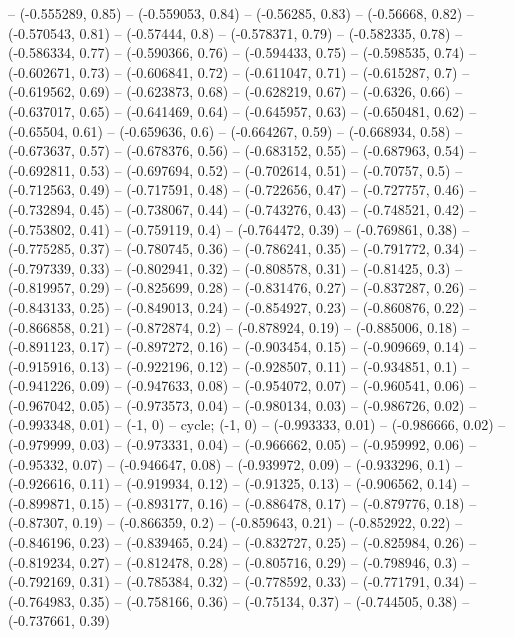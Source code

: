 -- (-0.555289, 0.85)
-- (-0.559053, 0.84)
-- (-0.56285, 0.83)
-- (-0.56668, 0.82)
-- (-0.570543, 0.81)
-- (-0.57444, 0.8)
-- (-0.578371, 0.79)
-- (-0.582335, 0.78)
-- (-0.586334, 0.77)
-- (-0.590366, 0.76)
-- (-0.594433, 0.75)
-- (-0.598535, 0.74)
-- (-0.602671, 0.73)
-- (-0.606841, 0.72)
-- (-0.611047, 0.71)
-- (-0.615287, 0.7)
-- (-0.619562, 0.69)
-- (-0.623873, 0.68)
-- (-0.628219, 0.67)
-- (-0.6326, 0.66)
-- (-0.637017, 0.65)
-- (-0.641469, 0.64)
-- (-0.645957, 0.63)
-- (-0.650481, 0.62)
-- (-0.65504, 0.61)
-- (-0.659636, 0.6)
-- (-0.664267, 0.59)
-- (-0.668934, 0.58)
-- (-0.673637, 0.57)
-- (-0.678376, 0.56)
-- (-0.683152, 0.55)
-- (-0.687963, 0.54)
-- (-0.692811, 0.53)
-- (-0.697694, 0.52)
-- (-0.702614, 0.51)
-- (-0.70757, 0.5)
-- (-0.712563, 0.49)
-- (-0.717591, 0.48)
-- (-0.722656, 0.47)
-- (-0.727757, 0.46)
-- (-0.732894, 0.45)
-- (-0.738067, 0.44)
-- (-0.743276, 0.43)
-- (-0.748521, 0.42)
-- (-0.753802, 0.41)
-- (-0.759119, 0.4)
-- (-0.764472, 0.39)
-- (-0.769861, 0.38)
-- (-0.775285, 0.37)
-- (-0.780745, 0.36)
-- (-0.786241, 0.35)
-- (-0.791772, 0.34)
-- (-0.797339, 0.33)
-- (-0.802941, 0.32)
-- (-0.808578, 0.31)
-- (-0.81425, 0.3)
-- (-0.819957, 0.29)
-- (-0.825699, 0.28)
-- (-0.831476, 0.27)
-- (-0.837287, 0.26)
-- (-0.843133, 0.25)
-- (-0.849013, 0.24)
-- (-0.854927, 0.23)
-- (-0.860876, 0.22)
-- (-0.866858, 0.21)
-- (-0.872874, 0.2)
-- (-0.878924, 0.19)
-- (-0.885006, 0.18)
-- (-0.891123, 0.17)
-- (-0.897272, 0.16)
-- (-0.903454, 0.15)
-- (-0.909669, 0.14)
-- (-0.915916, 0.13)
-- (-0.922196, 0.12)
-- (-0.928507, 0.11)
-- (-0.934851, 0.1)
-- (-0.941226, 0.09)
-- (-0.947633, 0.08)
-- (-0.954072, 0.07)
-- (-0.960541, 0.06)
-- (-0.967042, 0.05)
-- (-0.973573, 0.04)
-- (-0.980134, 0.03)
-- (-0.986726, 0.02)
-- (-0.993348, 0.01)
-- (-1, 0)
-- cycle;
\drawBand (-1, 0)
-- (-0.993333, 0.01)
-- (-0.986666, 0.02)
-- (-0.979999, 0.03)
-- (-0.973331, 0.04)
-- (-0.966662, 0.05)
-- (-0.959992, 0.06)
-- (-0.95332, 0.07)
-- (-0.946647, 0.08)
-- (-0.939972, 0.09)
-- (-0.933296, 0.1)
-- (-0.926616, 0.11)
-- (-0.919934, 0.12)
-- (-0.91325, 0.13)
-- (-0.906562, 0.14)
-- (-0.899871, 0.15)
-- (-0.893177, 0.16)
-- (-0.886478, 0.17)
-- (-0.879776, 0.18)
-- (-0.87307, 0.19)
-- (-0.866359, 0.2)
-- (-0.859643, 0.21)
-- (-0.852922, 0.22)
-- (-0.846196, 0.23)
-- (-0.839465, 0.24)
-- (-0.832727, 0.25)
-- (-0.825984, 0.26)
-- (-0.819234, 0.27)
-- (-0.812478, 0.28)
-- (-0.805716, 0.29)
-- (-0.798946, 0.3)
-- (-0.792169, 0.31)
-- (-0.785384, 0.32)
-- (-0.778592, 0.33)
-- (-0.771791, 0.34)
-- (-0.764983, 0.35)
-- (-0.758166, 0.36)
-- (-0.75134, 0.37)
-- (-0.744505, 0.38)
-- (-0.737661, 0.39)
